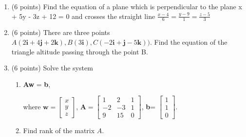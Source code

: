 \documentclass[]{exam}
\begin{document}
\begin{enumerate}

\item (6 points) 
Find the equation of a plane which is perpendicular to the plane x + 5y - 3z + 12 = 0 and crosses the straight line $\frac{x-4}{6} = \frac{y-9}{1} = \frac{z-5}{3}$ 





\item (6 points)  
There are three points $A(2\textbf{i} + 4\textbf{j} + 2\textbf{k}), B(3\textbf{i}), C(-2\textbf{i} + \textbf{j} - 5\textbf{k}))$. Find the equation of the triangle altitude passing through the point B.





\item (6 points) Solve the system 
\begin{enumerate}
    \item \textbf{Aw} = \textbf{b}, 
    
    where 
    $\textbf{w} =\begin{bmatrix}
    x \\ y \\ z
    \end{bmatrix}$,
    $\textbf{A}=\begin{bmatrix}
1 & 2 & 1 \\
-2 & -3 & 1 \\
9 & 15 & 0
\end{bmatrix}$, 
\textbf{b}=
$
\begin{bmatrix}
1 \\
1 \\
0
\end{bmatrix}$.
    

\item Find rank of the matrix $A$.


\end{enumerate}
\end{enumerate}
\end{document}
